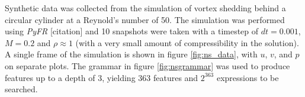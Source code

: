\documentclass{article}
\begin{document}
Synthetic data was collected from the simulation of vortex shedding behind a circular cylinder at a Reynold's number of 50. The simulation was performed using \emph{PyFR} [citation] and 10 snapshots were taken with a timestep of $dt = 0.001$, $M = 0.2$ and $\rho \approx 1$ (with a very small amount of compressibility in the solution). A single frame of the simulation is shown in figure \ref{fig:ns_data}, with $u$, $v$, and $p$ on separate plots. The grammar in figure \ref{fig:nsgrammar} was used to produce features up to a depth of 3, yielding 363 features and $2^{363}$ expressions to be searched.

\begin{figure}
  \vskip 0.2in
     \\
     \\

\end{figure}
\end{document}
